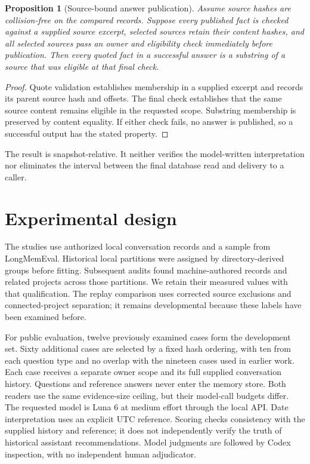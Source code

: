 \documentclass[11pt]{article}
\newtheorem{proposition}[theorem]{Proposition}
\begin{document}
\begin{proposition}[Source-bound answer publication]
Assume source hashes are collision-free on the compared records. Suppose every published fact is checked against a supplied source excerpt, selected sources retain their content hashes, and all selected sources pass an owner and eligibility check immediately before publication. Then every quoted fact in a successful answer is a substring of a source that was eligible at that final check.
\end{proposition}
\begin{proof}
Quote validation establishes membership in a supplied excerpt and records its parent source hash and offsets. The final check establishes that the same source content remains eligible in the requested scope. Substring membership is preserved by content equality. If either check fails, no answer is published, so a successful output has the stated property.
\end{proof}
The result is snapshot-relative. It neither verifies the model-written interpretation nor eliminates the interval between the final database read and delivery to a caller.

\section{Experimental design}
The studies use authorized local conversation records and a sample from LongMemEval. Historical local partitions were assigned by directory-derived groups before fitting. Subsequent audits found machine-authored records and related projects across those partitions. We retain their measured values with that qualification. The replay comparison uses corrected source exclusions and connected-project separation; it remains developmental because these labels have been examined before.

For public evaluation, twelve previously examined cases form the development set. Sixty additional cases are selected by a fixed hash ordering, with ten from each question type and no overlap with the nineteen cases used in earlier work. Each case receives a separate owner scope and its full supplied conversation history. Questions and reference answers never enter the memory store. Both readers use the same evidence-size ceiling, but their model-call budgets differ. The requested model is Luna 6 at medium effort through the local API. Date interpretation uses an explicit UTC reference. Scoring checks consistency with the supplied history and reference; it does not independently verify the truth of historical assistant recommendations. Model judgments are followed by Codex inspection, with no independent human adjudicator.
\end{document}
